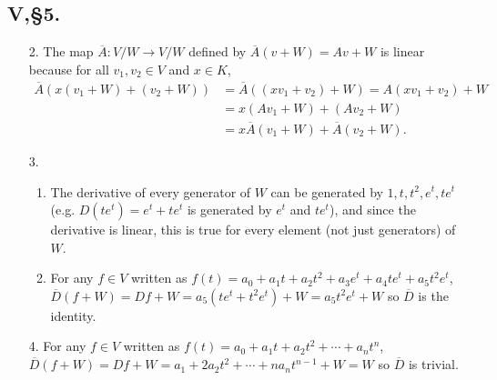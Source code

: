 \documentclass[12pt]{article}
\begin{document}
\subsection*{V,\S5.}
\begin{enumerate}
    \item[2.]
        The map $\overline{A} : V/W \to V/W$ defined by $\overline{A}(v + W) = Av + W$ is linear because for all $v_1, v_2 \in V$ and $x \in K$,
        \begin{align*}
            \overline{A}(x(v_1 + W) + (v_2 + W)) &= \overline{A}((xv_1 + v_2) + W) = A(xv_1 + v_2) + W \\
            &= x(Av_1 + W) + (Av_2 + W) \\
            &= x\overline{A}(v_1 + W) + \overline{A}(v_2 + W).
        \end{align*}

    \item[3.]
        \begin{enumerate}
            \item
                The derivative of every generator of $W$ can be generated by $1, t, t^2, e^t, te^t$ (e.g. $D(te^t) = e^t + te^t$ is generated by $e^t$ and $te^t$), and since the derivative is linear, this is true for every element (not just generators) of $W$.
            \item
                For any $f \in V$ written as $f(t) = a_0 + a_1t + a_2t^2 + a_3e^t + a_4te^t + a_5t^2e^t$, $\overline{D}(f + W) = Df + W = a_5(te^t + t^2e^t) + W = a_5t^2e^t + W$ so $\overline{D}$ is the identity.
        \end{enumerate}

    \item[4.]
        For any $f \in V$ written as $f(t) = a_0 + a_1t + a_2t^2 + \cdots + a_nt^n$, $\overline{D}(f + W) = Df + W = a_1 + 2a_2t^2 + \cdots + na_nt^{n - 1} + W = W$ so $\overline{D}$ is trivial.


\end{enumerate}
\end{document}
